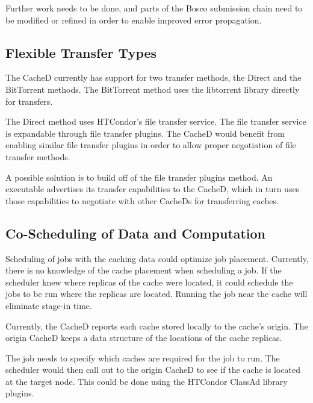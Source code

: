 Further work needs to be done, and parts of the Bosco submission chain need to be modified or refined in order to enable improved error propagation.

\subsection{Flexible Transfer Types}

The CacheD currently has support for two transfer methods, the Direct and the BitTorrent methods.  The BitTorrent method uses the libtorrent library directly for transfers.

The Direct method uses HTCondor's file transfer service.  The file transfer service is expandable through file transfer plugins.  The CacheD would benefit from enabling similar file transfer plugins in order to allow proper negotiation of file transfer methods.

A possible solution is to build off of the file transfer plugins method.  An executable advertises its transfer capabilities to the CacheD, which in turn uses those capabilities to negotiate with other CacheDs for transferring caches.


\subsection{Co-Scheduling of Data and Computation}

Scheduling of jobs with the caching data could optimize job placement.  Currently, there is no knowledge of the cache placement when scheduling a job.  If the scheduler knew where replicas of the cache were located, it could schedule the jobs to be run where the replicas are located.  Running the job near the cache will eliminate stage-in time.

Currently, the CacheD reports each cache stored locally to the cache's origin. The origin CacheD keeps a data structure of the locations of the cache replicas.

The job needs to specify which caches are required for the job to run.  The scheduler would then call out to the origin CacheD to see if the cache is located at the target node.  This could be done using the HTCondor ClassAd library plugins.







